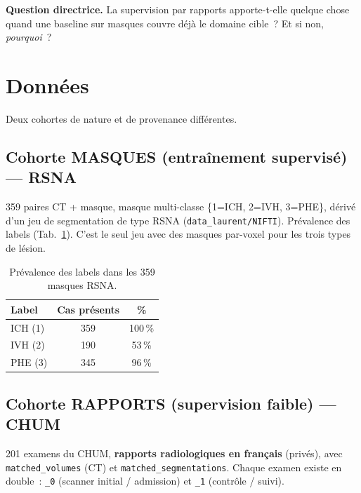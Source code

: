 \documentclass[11pt,a4paper]{article}
\begin{document}
\medskip\noindent\textbf{Question directrice.} La supervision par rapports apporte-t-elle
quelque chose quand une baseline sur masques couvre déjà le domaine cible~? Et si non,
\emph{pourquoi}~?

\section{Données}
Deux cohortes de nature et de provenance différentes.

\subsection{Cohorte MASQUES (entraînement supervisé) --- RSNA}
\label{sec:masks}
359 paires CT + masque, masque multi-classe \{1=ICH, 2=IVH, 3=PHE\}, dérivé d'un jeu de
segmentation de type RSNA (\texttt{data\_laurent/NIFTI}). Prévalence des labels
(Tab.~\ref{tab:prevalence}). C'est le seul jeu avec des masques par-voxel pour les trois
types de lésion.

\begin{table}[h]\centering
\caption{Prévalence des labels dans les 359 masques RSNA.}
\label{tab:prevalence}
\begin{tabular}{lcc}
\toprule
Label & Cas présents & \% \\
\midrule
ICH (1) & 359 & 100\,\% \\
IVH (2) & 190 & 53\,\% \\
PHE (3) & 345 & 96\,\% \\
\bottomrule
\end{tabular}
\end{table}

\subsection{Cohorte RAPPORTS (supervision faible) --- CHUM}
\label{sec:reports}
201 examens du CHUM, \textbf{rapports radiologiques en français} (privés), avec
\texttt{matched\_volumes} (CT) et \texttt{matched\_segmentations}. Chaque examen existe en
double~: \texttt{\_0} (scanner initial / admission) et \texttt{\_1} (contrôle / suivi).
\end{document}
